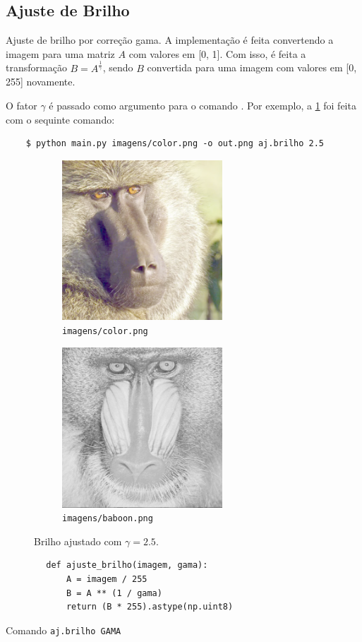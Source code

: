 \subsection{Ajuste de Brilho}

Ajuste de brilho por correção gama. A implementação é feita convertendo a imagem para uma matriz $A$ com valores em [0, 1]. Com isso, é feita a transformação $B = A^{\frac{1}{\gamma}}$,
sendo $B$ convertida para uma imagem com valores em [0, 255] novamente.

O fator $\gamma$ é passado como argumento para o comando . Por exemplo, a \cref{fig:ajbrilho} foi feita com o sequinte comando:

\begin{verbatim}
    $ python main.py imagens/color.png -o out.png aj.brilho 2.5
\end{verbatim}

\begin{figure}[H]
    \centering
    \begin{subfigure}{0.45\textwidth}
        \centering
        \includegraphics[width=6cm]{resultados/colorgama.png}
        \caption{\texttt{imagens/color.png}}
        \label{fig:ajbrilho}
    \end{subfigure}%
    \begin{subfigure}{0.45\textwidth}
        \centering
        \includegraphics[width=6cm]{resultados/baboongama.png}
        \caption{\texttt{imagens/baboon.png}}
    \end{subfigure}

    \caption{Brilho ajustado com $\gamma = 2.5$.}
\end{figure}

\begin{listing}[H]
    \begin{verbatim}
        def ajuste_brilho(imagem, gama):
            A = imagem / 255
            B = A ** (1 / gama)
            return (B * 255).astype(np.uint8)
    \end{verbatim}

    \caption{Comando \texttt{aj.brilho GAMA}}
\end{listing}
